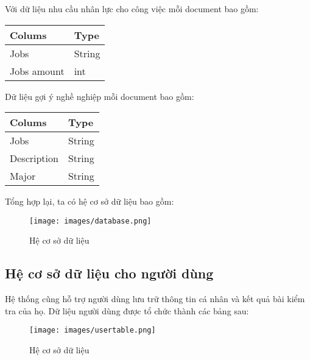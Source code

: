 Với dữ liệu nhu cầu nhân lực cho công việc mỗi document bao gồm:

\begin{table}[H]
    \centering
    \begin{tabular}{@{}ll@{}}
        \toprule
        \textbf{Colums} & \textbf{Type} \\ \midrule
        Jobs & String \\
        Jobs amount & int \\
        \bottomrule
    \end{tabular}
\end{table}

Dữ liệu gợi ý nghề nghiệp mỗi document bao gồm:
\begin{table}[H]
    \centering
    \begin{tabular}{@{}ll@{}}
        \toprule
        \textbf{Colums} & \textbf{Type} \\ \midrule
        Jobs & String \\
        Description & String \\
        Major & String \\
        \bottomrule
    \end{tabular}
\end{table}

Tổng hợp lại, ta có hệ cơ sở dữ liệu bao gồm:
\begin{figure}[H]
    \centering
    \texttt{[image: images/database.png]}
    \vspace{0.5cm}
    \caption{Hệ cơ sở dữ liệu}
\end{figure}

\subsection{Hệ cơ sở dữ liệu cho người dùng}
Hệ thống cũng hỗ trợ người dùng lưu trữ thông tin cá nhân và kết quả bài kiểm tra của họ. Dữ liệu người dùng được tổ chức thành các bảng sau:

\begin{figure}[H]
    \centering
    \texttt{[image: images/usertable.png]}
    \vspace{0.5cm}
    \caption{Hệ cơ sở dữ liệu}
\end{figure}

